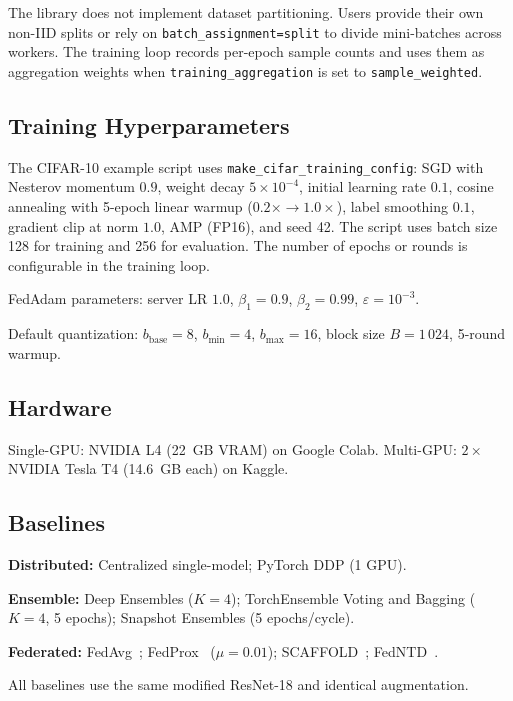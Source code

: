 \documentclass[journal,twoside]{IEEEtran}
\begin{document}
The library does not implement dataset partitioning. Users provide their
own non-IID splits or rely on \texttt{batch\_assignment=split} to divide
mini-batches across workers. The training loop records per-epoch sample
counts and uses them as aggregation weights when
\texttt{training\_aggregation} is set to \texttt{sample\_weighted}.

\subsection{Training Hyperparameters}

The CIFAR-10 example script uses \texttt{make\_cifar\_training\_config}:
SGD with Nesterov momentum $0.9$, weight decay $5\times10^{-4}$, initial
learning rate $0.1$, cosine annealing with 5-epoch linear warmup
($0.2\times \to 1.0\times$), label smoothing $0.1$, gradient clip at norm
$1.0$, AMP (FP16), and seed 42. The script uses batch size 128 for
training and 256 for evaluation. The number of epochs or rounds is
configurable in the training loop.

FedAdam parameters: server LR $1.0$, $\beta_1=0.9$, $\beta_2=0.99$,
$\varepsilon=10^{-3}$.

Default quantization: $b_{\mathrm{base}}=8$, $b_{\min}=4$,
$b_{\max}=16$, block size $B=1\,024$, 5-round warmup.

\subsection{Hardware}

Single-GPU: NVIDIA L4 (22~GB VRAM) on Google Colab.
Multi-GPU: $2\times$ NVIDIA Tesla T4 (14.6~GB each) on Kaggle.

\subsection{Baselines}

\textbf{Distributed:} Centralized single-model; PyTorch DDP (1 GPU).

\textbf{Ensemble:} Deep Ensembles ($K=4$); TorchEnsemble Voting and
Bagging ($K=4$, 5 epochs); Snapshot Ensembles (5 epochs/cycle).

\textbf{Federated:} FedAvg~\cite{mcmahan2017};
FedProx~\cite{li2020fedprox} ($\mu=0.01$);
SCAFFOLD~\cite{karimireddy2020scaffold};
FedNTD~\cite{lee2022fedndt}.

All baselines use the same modified ResNet-18 and identical augmentation.

\end{document}
